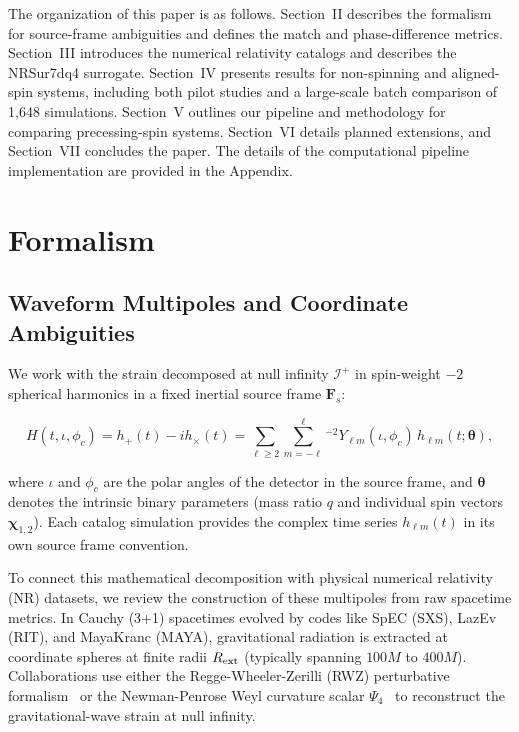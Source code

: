 \documentclass[%
 reprint,
superscriptaddress,
 amsmath,amssymb,
 aps,
]{revtex4-2}
\begin{document}
The organization of this paper is as follows. Section~II describes the formalism for source-frame ambiguities and defines the match and phase-difference metrics. Section~III introduces the numerical relativity catalogs and describes the NRSur7dq4 surrogate. Section~IV presents results for non-spinning and aligned-spin systems, including both pilot studies and a large-scale batch comparison of 1,648 simulations. Section~V outlines our pipeline and methodology for comparing precessing-spin systems. Section~VI details planned extensions, and Section~VII concludes the paper. The details of the computational pipeline implementation are provided in the Appendix.


\section{Formalism}

\subsection{Waveform Multipoles and Coordinate Ambiguities}

We work with the strain decomposed at null infinity $\mathcal{I}^+$ in spin-weight $-2$ spherical harmonics in a fixed inertial source frame $\mathbf{F}_s$:

\begin{equation}H(t, \iota, \phi_c) = h_+(t) - i h_\times(t) = \sum_{\ell \geq 2} \sum_{m=-\ell}^{\ell} {}^{-2}Y_{\ell m}(\iota, \phi_c)\, h_{\ell m}(t; \boldsymbol{\theta}),\end{equation}

where $\iota$ and $\phi_c$ are the polar angles of the detector in the source frame, and $\boldsymbol{\theta}$ denotes the intrinsic binary parameters (mass ratio $q$ and individual spin vectors $\boldsymbol{\chi}_{1,2}$). Each catalog simulation provides the complex time series $h_{\ell m}(t)$ in its own source frame convention.

To connect this mathematical decomposition with physical numerical relativity (NR) datasets, we review the construction of these multipoles from raw spacetime metrics. In Cauchy (3+1) spacetimes evolved by codes like SpEC (SXS), LazEv (RIT), and MayaKranc (MAYA), gravitational radiation is extracted at coordinate spheres at finite radii $R_{\rm ext}$ (typically spanning $100M$ to $400M$). Collaborations use either the Regge-Wheeler-Zerilli (RWZ) perturbative formalism~\cite{Regge:1957td, Zerilli:1970se, Martel:2005ir} or the Newman-Penrose Weyl curvature scalar $\Psi_4$~\cite{Newman:1963vrk, Teukolsky:1973ha, Newman:1965tw} to reconstruct the gravitational-wave strain at null infinity.
\end{document}
